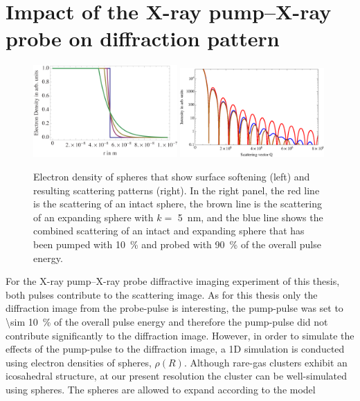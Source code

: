 \section{Impact of the X-ray pump--X-ray probe on diffraction pattern}\label{sec:pump--probe-considerations}
\begin{figure}
	\centering
		\includegraphics[width=0.49\textwidth]{images/electron-density-convoluted-object.png}
		\includegraphics[width=0.49\textwidth]{images/beam-convoluted-with-object.eps}
	\caption[Influence of X-ray pump--X-ray probe pulses to a diffraction image.]{Electron density of spheres that show surface softening (left) and resulting scattering patterns (right). In the right panel, the red line is the scattering of an intact sphere, the brown line is the scattering of an expanding sphere with $k=$ \SI{5}{\nano\meter}, and the blue line shows the combined scattering of an intact and expanding sphere that has been pumped with \SI{10}{\percent} and probed with \SI{90}{\percent} of the overall pulse energy.}
	\label{fig:electron-density-convoluted-object}
\end{figure}
For the X-ray pump--X-ray probe diffractive imaging experiment of this thesis, both pulses contribute to the scattering image. As for this thesis only the diffraction image from the probe-pulse is interesting, the pump-pulse was set to \SI{\sim 10}{\percent} of the overall pulse energy and therefore the pump-pulse did not contribute significantly to the diffraction image. However, in order to simulate the effects of the pump-pulse to the diffraction image, a 1D simulation is conducted using electron densities of spheres, $\rho\left(R\right)$. Although rare-gas clusters exhibit an icosahedral structure, at our present resolution the cluster can be well-simulated using spheres. The spheres are allowed to expand according to the model \cite{Gorkhover-2016-NatPho}
